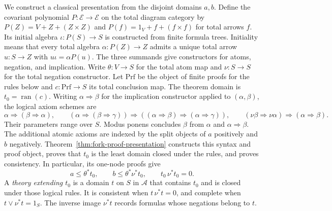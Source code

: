 \documentclass[11pt]{article}
\newcommand{\ran}{\operatorname{ran}}
\begin{document}
We construct a classical presentation from the disjoint domains $a,b$.
Define the covariant polynomial
$P:\mathcal E\to\mathcal E$ on the total diagram category by
$P(Z)=V+Z+(Z\times Z)$ and
$P(f)=1_V+f+(f\times f)$ for total arrows $f$.
Its initial algebra $\iota:P(S)\to S$ is constructed from finite
formula trees. Initiality means that every total algebra
$\alpha:P(Z)\to Z$ admits a unique total arrow $u:S\to Z$
with $u\iota=\alpha P(u)$.
The three summands give constructors for atoms, negation, and implication.
Write $\theta:V\to S$ for the total atom map
and $\nu:S\to S$ for the total negation constructor.
Let $\mathrm{Prf}$ be the object of finite proofs for the rules below
and $c:\mathrm{Prf}\to S$ its total conclusion map.
The theorem domain is $t_0=\ran(c)$.
Writing $\alpha\Rightarrow\beta$ for the implication constructor
applied to $(\alpha,\beta)$, the logical axiom schemes are
\[
 \alpha\Rightarrow(\beta\Rightarrow\alpha),\qquad
 (\alpha\Rightarrow(\beta\Rightarrow\gamma))
   \Rightarrow((\alpha\Rightarrow\beta)\Rightarrow
                         (\alpha\Rightarrow\gamma)),\qquad
 (\nu\beta\Rightarrow\nu\alpha)\Rightarrow(\alpha\Rightarrow\beta).
\]
Their parameters range over $S$. Modus ponens concludes $\beta$
from $\alpha$ and $\alpha\Rightarrow\beta$.
The additional atomic axioms are indexed by the split objects
of $a$ positively and $b$ negatively.
Theorem~\ref{thm:fork-proof-presentation} constructs this syntax and
proof object, proves that $t_0$ is the least domain closed under the
rules, and proves consistency. In particular, its one-node proofs give
\begin{equation}\label{eq:atomic-inequalities}
 a\le\theta^*t_0,\qquad
 b\le\theta^*\nu^*t_0,\qquad t_0\,\nu^*t_0=0.
\end{equation}
A \emph{theory extending $t_0$} is a domain $t$ on $S$ in $\mathcal A$ that
contains $t_0$ and is closed under those logical rules.
It is consistent when $t\,\nu^*t=0$, and complete when
$t\vee\nu^*t=1_S$. The inverse image $\nu^*t$ records formulas
whose negations belong to $t$.
\end{document}
